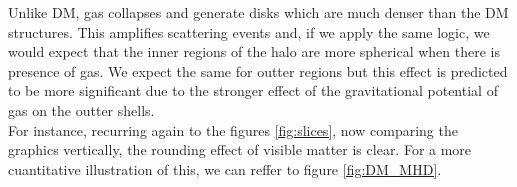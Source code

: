  Unlike DM, gas collapses and generate disks which are much denser than the DM structures. This amplifies scattering events and, if we apply the same logic, we would expect that the inner regions of the halo are more spherical when there is presence of gas. We expect the same for outter regions but this effect is predicted to be more significant due to the stronger effect of the gravitational potential of gas on the outter shells.\\

For instance, recurring again to the figures \ref{fig:slices}, now comparing the graphics vertically, the rounding effect of visible matter is clear. For a more cuantitative illustration of this, we can reffer to figure \ref{fig:DM_MHD}. \\
\begin{figure}[!ht]
  \centering
  \hfill

\end{figure}

